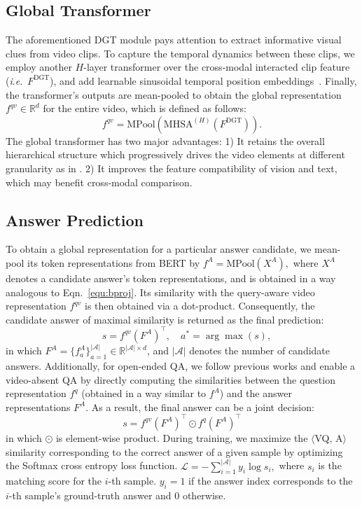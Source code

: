 \documentclass[runningheads]{llncs}
\newcommand{\ie}{\textit{i}.\textit{e}.}
\begin{document}
\subsection{Global Transformer}
\label{sec:gt}
The aforementioned DGT module pays attention to extract informative visual clues from video clips. To capture the temporal dynamics between these clips, we employ another $H$-layer transformer over the cross-modal interacted clip feature (\ie~$F^{\text{DGT}}$), and add learnable sinusoidal temporal position embeddings~\cite{devlin2018bert}. Finally, the transformer's outputs are mean-pooled to obtain the global representation $f^{qv}\in\mathbb{R}^d$ for the entire video, which is defined as follows:
\begin{equation}
\label{equ:gbtrans}
    f^{qv} = \text{MPool}(\text{MHSA}^{(H)}(F^{\text{DGT}})).
\end{equation}
The global transformer has two major advantages: 1) It retains the overall hierarchical structure which progressively drives the video elements at different granularity as in \cite{xiao2021video}. 2) It improves the feature compatibility of vision and text, which may benefit cross-modal comparison.

\subsection{Answer Prediction}
\label{sec:ad}
To obtain a global representation for a particular answer candidate, we mean-pool its token representations from BERT by 
$
    f^A = \text{MPool}(X^A),
$
where $X^A$ denotes a candidate answer's token representations, and is obtained in a way analogous to Eqn.~\eqref{equ:bproj}. Its similarity with the query-aware video representation $f^{qv}$ is then obtained via a dot-product. Consequently, the candidate answer of maximal similarity is returned as the final prediction:
\begin{equation}
    \quad s=f^{qv}(F^A)^\mathcal{\top}, \quad a^* = \arg \max(s),
\end{equation}
in which $F^A=\{f^A_a\}_{a=1}^{|\mathcal{A}|}\in\mathbb{R}^{|\mathcal{A}|\times d}$, and $|\mathcal{A}|$ denotes the number of candidate answers.
Additionally, for open-ended QA, we follow previous works \cite{xiao2021video} and enable a video-absent QA by directly computing the similarities between the question representation $f^q$ (obtained in a way similar to $f^A$) and the answer representations $F^A$. As a result, the final answer can be a joint decision: 
\begin{equation}
\label{equ:oe}
    s=f^{qv}(F^A)^\mathcal{\top} \odot f^q(F^A)^{\mathcal{\top}}
\end{equation}
in which $\odot$ is element-wise product. 
During training, we maximize the $\langle$VQ, A$\rangle$ similarity corresponding to the correct answer of a given sample by optimizing the Softmax cross entropy loss function.
$
   \mathcal{L}= -\sum\nolimits_{i=1}^{|\mathcal{A}|} y_i \log s_i,
$
where $s_i$ is the matching score for the $i$-th sample. $y_i=1$ if the answer index corresponds to the $i$-th sample's ground-truth answer and 0 otherwise.
\end{document}
